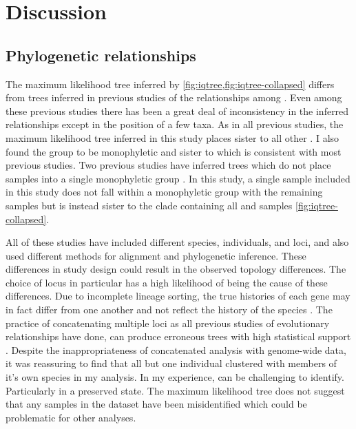 \section{Discussion}

\subsection{Phylogenetic relationships}
The maximum likelihood tree inferred by \iqtree \cref{fig:iqtree,fig:iqtree-collapsed} 
differs from trees inferred in previous studies of the relationships 
among \anaxyrus \parencite{fontenot2011,graybeal1997,masta2002,pramuk2007,pyron2011,portik2023}.
Even among these previous studies there has been a great deal of inconsistency in
the inferred relationships except in the position of a few taxa.
As in all previous studies, the maximum likelihood tree inferred in this 
study places \punctatus sister to all other \anaxyrus.
I also found the \americanus group to be monophyletic and sister to \microscaphus 
which is consistent with most previous studies.
Two previous studies have inferred trees which do not place \fowl samples
into a single monophyletic group \parencite{masta2002,fontenot2011}.
In this study, a single \fowl sample included in this study does not fall within a monophyletic 
group with the remaining \fowl samples but is instead sister to the clade 
containing all \fowl and \wood samples \cref{fig:iqtree-collapsed}.

All of these studies have included different species, individuals, and loci, and 
also used different methods for alignment and phylogenetic inference. 
These differences in study design could result in the observed topology differences. 
The choice of locus in particular has a high likelihood of being the cause of these differences. 
Due to incomplete lineage sorting, the true histories of each gene may in fact 
differ from one another and not reflect the history of the species \parencite{kingman1982}. 
The practice of concatenating multiple loci as all previous studies of
\anaxyrus evolutionary relationships have done, can produce erroneous trees  
with high statistical support \parencite{kubatko2007}.
Despite the inappropriateness of concatenated analysis with genome-wide data,
it was reassuring to find that all but one individual clustered with members
of it's own species in my analysis. 
In my experience, \anaxyrus can be challenging to identify. 
Particularly in a preserved state. 
The maximum likelihood tree does not suggest that any samples in the dataset 
have been misidentified which could be problematic for other analyses.

